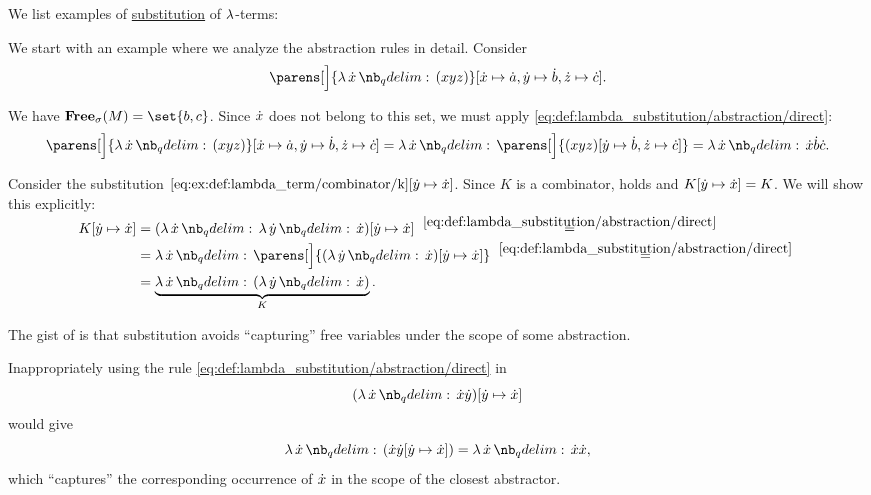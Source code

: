 \begin{example}\label{ex:def:lambda_substitution}
  We list examples of \hyperref[def:lambda_substitution]{substitution} of \( \mathrm{\lambda} \)-terms:
  \begin{thmenum}
     We start with an example where we analyze the abstraction rules in detail. Consider
    \begin{equation*}
      \parens[\Big]{ \qabs \synx (xyz) }[\synx \mapsto \syna, \syny \mapsto \synb, \synz \mapsto \sync].
    \end{equation*}

    We have \( \op*{Free}_\sigma(M) = \set{ b, c } \). Since \( {\dot{x}} \) does not belong to this set, we must apply \eqref{eq:def:lambda_substitution/abstraction/direct}:
    \begin{equation*}
      \parens[\Big]{ \qabs \synx (xyz) }[\synx \mapsto \syna, \syny \mapsto \synb, \synz \mapsto \sync]
      =
      \qabs \synx \parens[\Big]{ (xyz)[\syny \mapsto \synb, \synz \mapsto \sync] }
      =
      \qabs \synx \synx \synb \sync.
    \end{equation*}

     Consider the substitution \( \ref{eq:ex:def:lambda_term/combinator/k}[{\dot{y}} \mapsto {\dot{x}}] \). Since \( K \) is a combinator,  holds and \( K[{\dot{y}} \mapsto {\dot{x}}] = K \). We will show this explicitly:
    \begin{align*}
      K[\syny \mapsto \synx]
      &=
      (\qabs \synx \qabs \syny \synx)[\syny \mapsto \synx]
      \reloset {\eqref{eq:def:lambda_substitution/abstraction/direct}} = \\ &=
      \qabs \synx \parens[\Big]{ (\qabs \syny \synx)[\syny \mapsto \synx] }
      \reloset {\eqref{eq:def:lambda_substitution/abstraction/direct}} = \\ &=
      \underbrace{\qabs \synx (\qabs \syny \synx)}_{K}.
    \end{align*}

     The gist of  is that substitution avoids \enquote{capturing} free variables under the scope of some abstraction.

    Inappropriately using the rule \eqref{eq:def:lambda_substitution/abstraction/direct} in
    \begin{equation*}
      (\qabs \synx \synx \syny)[\syny \mapsto \synx]
    \end{equation*}
    would give
    \begin{equation*}
      \qabs \synx (\synx \syny[\syny \mapsto \synx]) = \qabs \synx \synx \synx,
    \end{equation*}
    which \enquote{captures} the corresponding occurrence of \( {\dot{x}} \) in the scope of the closest abstractor.


\end{thmenum}
\end{example}
